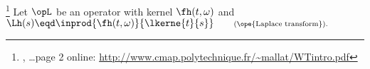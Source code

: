 \begin{theorem}
\footnote{
  ,
  \ldots page 2 online: \url{http://www.cmap.polytechnique.fr/~mallat/WTintro.pdf}
  }
\label{thm:Le=he}
Let $\opL$ be an operator with kernel $\fh(t,\omega)$ and
\\\indentx$\Lh(s)\eqd \inprod{\fh(t,\omega)}{\lkerne{t}{s}}
   \qquad\scriptstyle
   \text{(\ope{Laplace transform}).}
$\\
\end{theorem}
